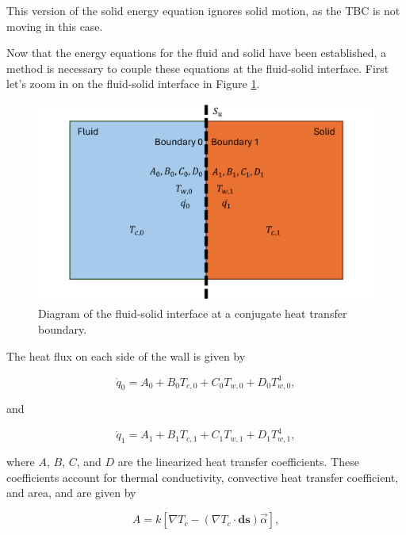 \documentclass{UCF_ETD}
\begin{document}
This version of the solid energy equation ignores solid motion, as the TBC is not moving in this case.

Now that the energy equations for the fluid and solid have been established, a method is necessary to couple these equations at the fluid-solid interface. First let's zoom in on the fluid-solid interface in Figure \ref{fig:conjugateHT_diagram}.

\begin{figure}[htp!]
\centering
\includegraphics[width=\linewidth]{Figures/conjugateHeatTransferDiagram.png}
\caption{Diagram of the fluid-solid interface at a conjugate heat transfer boundary.}
\label{fig:conjugateHT_diagram}
\end{figure}

The heat flux on each side of the wall is given by

\begin{equation}
    \Dot{q}_{0} = A_{0} + B_{0}T_{c,0} + C_{0}T_{w,0} + D_{0}T^{4}_{w,0},
    \label{eq:q0}
\end{equation}

and 

\begin{equation}
    \Dot{q}_{1} = A_{1} + B_{1}T_{c,1} + C_{1}T_{w,1} + D_{1}T^{4}_{w,1},
    \label{eq:q1}
\end{equation}

where $A$, $B$, $C$, and $D$ are the linearized heat transfer coefficients. These coefficients account for thermal conductivity, convective heat transfer coefficient, and area, and are given by

\begin{equation}
    A = k\left[ \nabla T_{c} - \left( \nabla T_{c} \cdot \mathbf{ds} \right) \vec{\alpha}\right],
    \label{eq:HTC_A}
\end{equation}
\end{document}
